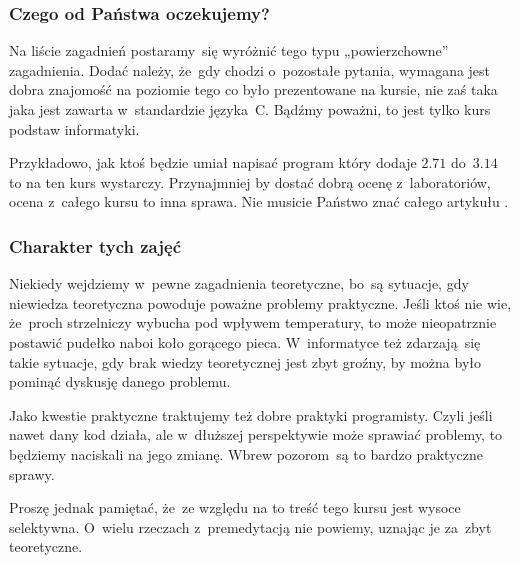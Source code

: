 \documentclass[10pt,t]{beamer}
\begin{document}
\begin{frame}
  \frametitle{Czego od Państwa oczekujemy?}


  Na liście zagadnień postaramy~się wyróżnić tego typu „powierzchowne”
  zagadnienia. Dodać należy, że~gdy chodzi o~pozostałe pytania, wymagana
  jest dobra znajomość na \alert{poziomie tego co było prezentowane na
    kursie}, nie zaś taka jaka jest zawarta w~standardzie języka~C.
  Bądźmy poważni, to jest tylko kurs podstaw informatyki.

  Przykładowo, jak ktoś będzie umiał napisać program który dodaje $2.71$
  do~$3.14$ to na \alert{ten} kurs wystarczy. Przynajmniej by dostać dobrą
  ocenę z~laboratoriów, ocena z~\alert{całego} kursu to inna sprawa.
  Nie musicie Państwo znać całego artykułu
  .


\end{frame}





\begin{frame}
  \frametitle{Charakter tych zajęć}


  Niekiedy wejdziemy w~pewne zagadnienia teoretyczne, bo~są sytuacje, gdy
  niewiedza teoretyczna powoduje poważne problemy praktyczne. Jeśli ktoś
  nie wie, że~proch strzelniczy wybucha pod wpływem temperatury, to może
  nieopatrznie postawić pudełko naboi koło gorącego pieca. W~informatyce
  też zdarzają~się takie sytuacje, gdy brak wiedzy teoretycznej jest zbyt
  groźny, by można było pominąć dyskusję danego problemu.

  Jako kwestie praktyczne traktujemy też dobre praktyki programisty.
  Czyli jeśli nawet dany kod działa, ale w~dłuższej perspektywie może
  sprawiać problemy, to będziemy naciskali na jego zmianę. Wbrew
  pozorom~są to bardzo praktyczne sprawy.

  Proszę jednak pamiętać, że~ze względu na to treść tego kursu jest wysoce
  selektywna. O~wielu rzeczach z~premedytacją nie powiemy, uznając je
  za~zbyt teoretyczne.

\end{frame}
\end{document}
